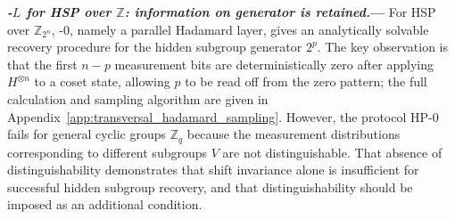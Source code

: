 \documentclass[reprint, aps, prl, superscriptaddress]{revtex4-2}
\renewcommand{\section}[1]{\par\medskip\noindent\textbf{{\textit{#1.}---}}}
\newcommand{\myqc}{\text{HP}}
\begin{document}



\section{\myqc-$L$ for HSP over $\mathbb{Z}$: information on generator is retained}
For HSP over $\mathbb Z_{2^n}$, \myqc-0, namely a parallel Hadamard layer,
gives an analytically solvable recovery procedure for the hidden subgroup
generator $2^p$. The key observation is that the first $n-p$ measurement bits
are deterministically zero after applying $H^{\otimes n}$ to a coset state,
allowing $p$ to be read off from the zero pattern; the full calculation and
sampling algorithm are given in
Appendix~\ref{app:transversal_hadamard_sampling}. However, the protocol $\myqc$-0 fails for general cyclic groups $\mathbb{Z}_q$ because the measurement distributions corresponding to different subgroups $V$ are not distinguishable. That absence of distinguishability demonstrates that shift invariance alone is insufficient for successful hidden subgroup recovery, and that distinguishability should be imposed as an additional condition. 
\end{document}
